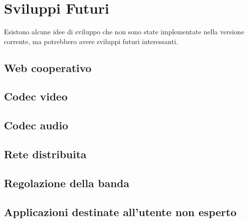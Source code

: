 \chapter{Sviluppi Futuri}

Esistono alcune idee di sviluppo che non sono state implementate nella versione
corrente, ma potrebbero avere sviluppi futuri interessanti.


\section{Web cooperativo}

\section{Codec video}

\section{Codec audio}

\section{Rete distribuita}

\section{Regolazione della banda}

\section{Applicazioni destinate all'utente non esperto}